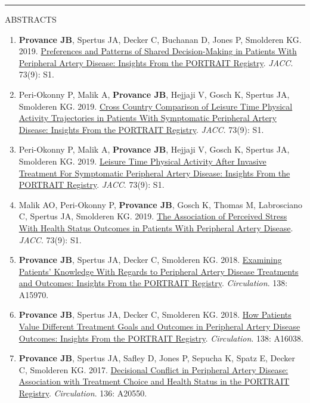 \documentclass[
]{article}
\begin{document}
\begin{center}\rule{0.5\linewidth}{0.5pt}\end{center}

ABSTRACTS

\begin{enumerate}
\def\labelenumi{\arabic{enumi}.}
\item
  \textbf{Provance JB}, Spertus JA, Decker C, Buchanan D, Jones P,
  Smolderen KG. 2019.
  \href{http://www.onlinejacc.org/content/73/9_Supplement_1/3006.abstract}{Preferences
  and Patterns of Shared Decision-Making in Patients With Peripheral
  Artery Disease: Insights From the PORTRAIT Registry}. \emph{JACC}.
  73(9): S1.
\item
  Peri-Okonny P, Malik A, \textbf{Provance JB}, Hejjaji V, Gosch K,
  Spertus JA, Smolderen KG. 2019.
  \href{http://www.onlinejacc.org/content/73/9_Supplement_1/2100.abstract}{Cross
  Country Comparison of Leisure Time Physical Activity Trajectories in
  Patients With Symptomatic Peripheral Artery Disease: Insights From the
  PORTRAIT Registry}. \emph{JACC}. 73(9): S1.
\item
  Peri-Okonny P, Malik A, \textbf{Provance JB}, Hejjaji V, Gosch K,
  Spertus JA, Smolderen KG. 2019.
  \href{http://www.onlinejacc.org/content/73/9_Supplement_1/2093.abstract}{Leisure
  Time Physical Activity After Invasive Treatment For Symptomatic
  Peripheral Artery Disease: Insights From the PORTRAIT Registry}.
  \emph{JACC}. 73(9): S1.
\item
  Malik AO, Peri-Okonny P, \textbf{Provance JB}, Gosch K, Thomas M,
  Labrosciano C, Spertus JA, Smolderen KG. 2019.
  \href{http://www.onlinejacc.org/content/73/9_Supplement_1/2081.abstract}{The
  Association of Perceived Stress With Health Status Outcomes in
  Patients With Peripheral Artery Disease}. \emph{JACC}. 73(9): S1.
\item
  \textbf{Provance JB}, Spertus JA, Decker C, Smolderen KG. 2018.
  \href{https://www.ahajournals.org/doi/abs/10.1161/circ.138.suppl_1.15970}{Examining
  Patients' Knowledge With Regards to Peripheral Artery Disease
  Treatments and Outcomes: Insights From the PORTRAIT Registry}.
  \emph{Circulation}. 138: A15970.
\item
  \textbf{Provance JB}, Spertus JA, Decker C, Smolderen KG. 2018.
  \href{https://www.ahajournals.org/doi/abs/10.1161/circ.138.suppl_1.16038}{How
  Patients Value Different Treatment Goals and Outcomes in Peripheral
  Artery Disease Outcomes: Insights From the PORTRAIT Registry}.
  \emph{Circulation}. 138: A16038.
\item
  \textbf{Provance JB}, Spertus JA, Safley D, Jones P, Sepucha K, Spatz
  E, Decker C, Smolderen KG. 2017.
  \href{https://www.ahajournals.org/doi/abs/10.1161/circ.136.suppl_1.20550}{Decisional
  Conflict in Peripheral Artery Disease: Association with Treatment
  Choice and Health Status in the PORTRAIT Registry}.
  \emph{Circulation}. 136: A20550.
\end{enumerate}
\end{document}
